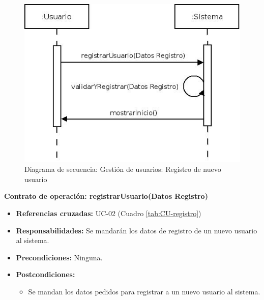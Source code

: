 \vspace{7mm}
\dotfill
\vspace{7mm}

\begin{figure}[h!]
\centering
  \includegraphics[scale=.55]{img/secuencias/gestion-usuarios-registro.jpeg}
  \caption{Diagrama de secuencia: Gestión de usuarios: Registro de nuevo usuario}
  \label{fig:secuencia-gestion-usuarios-registro}
\end{figure}


\textbf{Contrato de operación: registrarUsuario(Datos Registro)}
\begin{itemize}
\item \textbf{Referencias cruzadas:} UC-02 (Cuadro \ref{tab:CU-registro})
\item \textbf{Responsabilidades:} Se mandarán los datos de registro de un nuevo usuario al sistema.
\item \textbf{Precondiciones:} Ninguna.
\item \textbf{Postcondiciones:} 
 \begin{itemize}
\item Se mandan los datos pedidos para registrar a un nuevo usuario al sistema.
\end {itemize}
\end {itemize}


